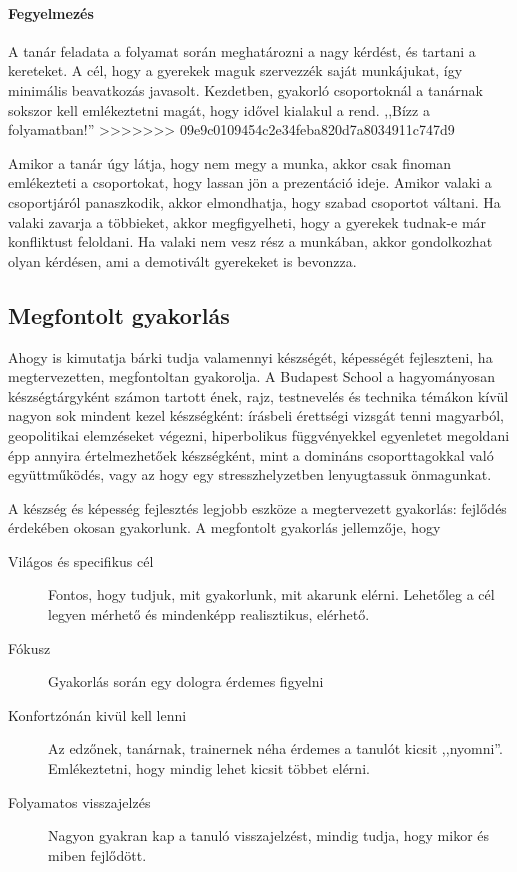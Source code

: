 \paragraph{Fegyelmezés}
A tanár feladata a folyamat során meghatározni a nagy kérdést, és tartani a kereteket. A cél, hogy a gyerekek maguk szervezzék saját munkájukat, így minimális beavatkozás javasolt. Kezdetben, gyakorló csoportoknál a tanárnak sokszor kell emlékeztetni magát, hogy idővel kialakul a rend. ,,Bízz a folyamatban!''
>>>>>>> 09e9c0109454c2e34feba820d7a8034911c747d9

Amikor a tanár úgy látja, hogy nem megy a munka, akkor csak finoman emlékezteti a csoportokat, hogy lassan jön a prezentáció ideje. Amikor valaki a csoportjáról panaszkodik, akkor elmondhatja, hogy szabad csoportot váltani. Ha valaki zavarja a többieket, akkor megfigyelheti, hogy a gyerekek tudnak-e már konfliktust feloldani. Ha valaki nem vesz rész a munkában, akkor gondolkozhat olyan kérdésen, ami a demotivált gyerekeket is bevonzza.

\subsection{Megfontolt gyakorlás}
Ahogy \citep{ericsson2016peak} is kimutatja bárki tudja valamennyi készségét, képességét fejleszteni, ha megtervezetten, megfontoltan gyakorolja. A Budapest School a hagyományosan készségtárgyként számon tartott ének, rajz, testnevelés és technika témákon kívül nagyon sok mindent kezel készségként: írásbeli érettségi vizsgát tenni magyarból, geopolitikai elemzéseket végezni, hiperbolikus függvényekkel egyenletet megoldani épp annyira értelmezhetőek készségként, mint a domináns csoporttagokkal való együttműködés, vagy az hogy egy stresszhelyzetben lenyugtassuk önmagunkat.

A készség és képesség fejlesztés legjobb eszköze a megtervezett gyakorlás: fejlődés érdekében okosan gyakorlunk. A megfontolt gyakorlás jellemzője, hogy

\begin{description}
  \item[Világos és specifikus cél] Fontos, hogy tudjuk, mit gyakorlunk, mit akarunk elérni.  Lehetőleg a cél legyen mérhető és mindenképp realisztikus, elérhető.
  \item[Fókusz] Gyakorlás során egy dologra érdemes figyelni
  \item[Konfortzónán kivül kell lenni] Az edzőnek, tanárnak, trainernek néha érdemes a tanulót kicsit ,,nyomni''. Emlékeztetni, hogy mindig lehet kicsit többet elérni.
  \item[Folyamatos visszajelzés] Nagyon gyakran kap a tanuló visszajelzést, mindig tudja, hogy mikor és miben fejlődött.
\end{description}

